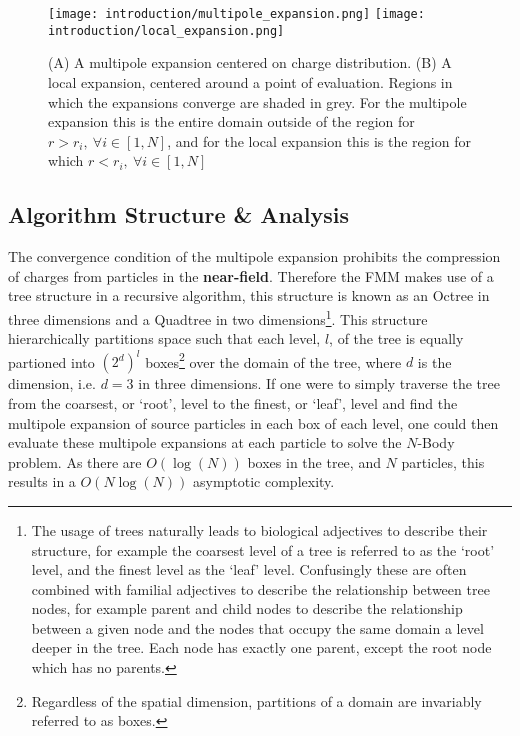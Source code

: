 \begin{figure}[!h]
    \centering
    {\texttt{[image: introduction/multipole\_expansion.png]}}
    \hfill
  {\texttt{[image: introduction/local\_expansion.png]}}
  \vspace{0pt}
  \caption{(A) A multipole expansion centered on charge distribution. (B) A local
  expansion, centered around a point of evaluation. Regions in which the expansions
  converge are shaded in grey. For the multipole expansion this is the entire domain
  outside of the region for $r>r_i, \> \forall i \in [1, N]$, and for the local expansion this is the region
  for which $r < r_i, \>  \forall i \in [1, N]$}

  \label{fig:1_1_multipole_local_expansions}
\end{figure}

\hspace{10pt}

\subsection{Algorithm Structure \& Analysis}

The convergence condition of the multipole expansion prohibits the compression
of charges from particles in the \textbf{\gls{near-field}}. Therefore the FMM
makes use of a tree structure in a recursive algorithm, this structure is known
as an Octree in three dimensions and a Quadtree in two dimensions\footnote{The usage
of trees naturally leads to biological adjectives to describe their structure, for example
the coarsest level of a tree is referred to as the `root' level, and the finest
level as the `leaf' level. Confusingly these are often combined with familial adjectives
to describe the relationship between tree nodes, for example parent and child nodes to describe
the relationship between a given node and the nodes that occupy the same domain
a level deeper in the tree. Each node has exactly one parent, except the root node which
has no parents.}. This structure
hierarchically partitions space such that each level, $l$, of the tree is equally partioned into
$(2^d)^l$ boxes\footnote{Regardless of the spatial dimension, partitions of a domain are invariably
referred to as boxes.} over the domain of the tree, where $d$ is the dimension,
i.e. $d=3$ in three dimensions. If one were to simply traverse the tree from
the coarsest, or `root', level to the finest, or `leaf', level and find the multipole expansion of source
particles in each box of each level, one could then evaluate these multipole expansions
at each particle to solve the $N$-Body problem. As there are $O(\log(N))$
boxes in the tree, and $N$ particles, this results in a $O(N\log(N))$ asymptotic
complexity.

